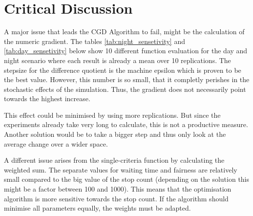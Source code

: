 \documentclass[./\jobname.tex]{subfiles}
\begin{document}
\chapter{Critical Discussion}

A major issue that leads the CGD Algorithm to fail, might be the calculation of the numeric gradient. The tables \ref{tab:night_sensetivity} and \ref{tab:day_sensetivity} below show 10 different function evaluation for the day and night scenario where each result is already a mean over 10 replications. The stepsize for the difference quotient is the machine epsilon which is proven to be the best value. However, this number is so small, that it completly perishes in the stochastic effects of the simulation. Thus, the gradient does not necessarily point towards the highest increase. 


This effect could be minimised by using more replications. But since the experiments already take very long to calculate, this is not a productive measure. Another solution would be to take a bigger step and thus only look at the average change over a wider space. 


A different issue arises from the single-criteria function by calculating the weighted sum. The separate values for waiting time and fairness are relatively small compared to the big value of the stop count (depending on the solution this might be a factor between 100 and 1000). This means that the optimisation algorithm is more sensitive towards the stop count. If the algorithm should minimise all parameters equally, the weights must be adapted.  

\begin{table}[h]
	\centering
	\noindent{}
	\label{tab:night_sensetivity}
\end{table}
\end{document}
